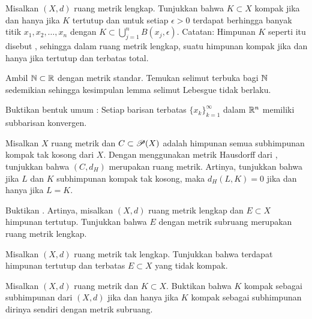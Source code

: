 \begin{exercise}[Menantang] \label{exercise:mstotbound}
Misalkan $(X,d)$ ruang metrik lengkap.
Tunjukkan bahwa $K \subset X$ kompak jika dan hanya jika $K$ tertutup
dan untuk setiap $\epsilon > 0$
terdapat berhingga banyak titik $x_1,x_2,\ldots,x_n$ dengan
$K \subset \bigcup_{j=1}^n B(x_j,\epsilon)$.
Catatan: Himpunan $K$ seperti itu disebut \emph{},
sehingga dalam ruang metrik lengkap, suatu himpunan kompak jika dan hanya
jika tertutup dan terbatas total.
\end{exercise}

\begin{exercise}
Ambil ${\mathbb{N}} \subset {\mathbb{R}}$ dengan metrik standar.  Temukan selimut terbuka bagi ${\mathbb{N}}$
sedemikian sehingga kesimpulan lemma selimut Lebesgue tidak berlaku.
\end{exercise}

\begin{exercise}
Buktikan bentuk umum :
Setiap barisan terbatas $\{ x_k \}_{k=1}^\infty$ dalam ${\mathbb{R}}^n$
memiliki subbarisan konvergen.
\end{exercise}

\begin{exercise}
Misalkan $X$ ruang metrik dan
$C \subset {\mathscr{P}}(X)$ adalah himpunan semua subhimpunan kompak tak kosong dari $X$.
Dengan menggunakan metrik Hausdorff dari ,
tunjukkan bahwa $(C,d_H)$ merupakan ruang metrik.  Artinya, tunjukkan bahwa
jika $L$ dan $K$ subhimpunan kompak tak kosong, maka $d_H(L,K) = 0$
jika dan hanya jika $L=K$.
\end{exercise}

\begin{exercise} \label{exercise:closedcomplete}
Buktikan .  Artinya,
misalkan $(X,d)$ ruang metrik lengkap dan $E \subset X$ himpunan tertutup.
Tunjukkan bahwa $E$ dengan metrik subruang merupakan ruang metrik lengkap.
\end{exercise}

\begin{exercise}
Misalkan $(X,d)$ ruang metrik tak lengkap.  Tunjukkan bahwa terdapat
himpunan tertutup dan terbatas $E \subset X$ yang tidak kompak.
\end{exercise}

\begin{exercise}
Misalkan $(X,d)$ ruang metrik dan $K \subset X$.
Buktikan bahwa $K$ kompak sebagai subhimpunan dari $(X,d)$ jika dan hanya jika $K$
kompak sebagai subhimpunan dirinya sendiri dengan metrik subruang.
\end{exercise}

